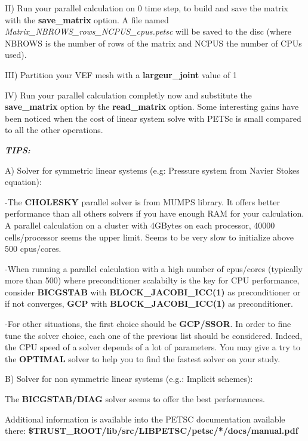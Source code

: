 II) Run your parallel calculation on 0 time step, to build and save the matrix with the \textbf{save\_matrix} option. A
file named \textit{Matrix\_NBROWS\_rows\_NCPUS\_cpus.petsc} will be saved to the disc (where NBROWS is the number of
rows of the matrix and NCPUS the number of CPUs used). 

III) Partition your VEF mesh with a \textbf{largeur\_joint} value of 1

IV) Run your parallel calculation completly now and substitute the \textbf{save\_matrix} option by the
\textbf{read\_matrix} option. Some interesting gains have been noticed when the cost of linear system solve with PETSc
is small compared to all the other operations. 


\bigskip


\bigskip

{\bfseries\itshape
TIPS:}

A) Solver for symmetric linear systems (e.g: Pressure system from Navier Stokes equation):

{}-The \textbf{CHOLESKY} parallel solver is from MUMPS library. It offers better performance than all others solvers if
you have enough RAM for your calculation. A parallel calculation on a cluster with 4GBytes on each processor, 40000
cells/processor seems the upper limit. Seems to be very slow to initialize above 500 cpus/cores.


\bigskip

{}-When running a parallel calculation with a high number of cpus/cores (typically more than 500) where preconditioner
scalabilty is the key for CPU performance, consider \textbf{BICGSTAB }with \textbf{BLOCK\_JACOBI\_ICC(1)} as
preconditioner or if not converges, \textbf{GCP}\textbf{ }with\textbf{ BLOCK\_JACOBI\_ICC(1) }as
preconditioner.


\bigskip

{}-For other situations, the first choice should be \textbf{GCP}\textbf{/SSOR}. In order to fine
tune the solver choice, each one of the previous list should be considered. Indeed, the CPU speed of a solver depends
of a lot of parameters. You may give a try to the \textbf{OPTIMAL} solver to help you to find the fastest solver on
your study. 


\bigskip

B) Solver for non symmetric linear systems (e.g.: Implicit schemes):

The \textbf{BICGSTAB/DIAG }solver seems to offer the best performances.


\bigskip

Additional information is available into the PETSC documentation available there:
\textbf{\$TRUST\_ROOT/lib/src/LIBPETSC/petsc/*/docs/manual.pdf}

